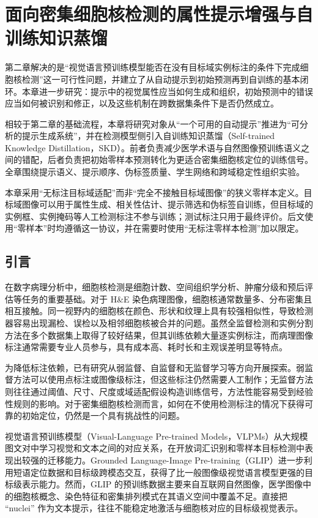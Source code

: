 \chapter{面向密集细胞核检测的属性提示增强与自训练知识蒸馏}

第二章解决的是“视觉语言预训练模型能否在没有目标域实例标注的条件下完成细胞核检测”这一可行性问题，并建立了从自动提示到初始预测再到自训练的基本闭环。本章进一步研究：提示中的视觉属性应当如何生成和组织，初始预测中的错误应当如何被识别和修正，以及这些机制在跨数据集条件下是否仍然成立。

相较于第二章的基础流程，本章将研究对象从“一个可用的自动提示”推进为“可分析的提示生成系统”，并在检测模型侧引入自训练知识蒸馏（Self-trained Knowledge Distillation，SKD）。前者负责减少医学术语与自然图像预训练语义之间的错配，后者负责把初始零样本预测转化为更适合密集细胞核定位的训练信号。全章围绕提示语义、提示顺序、伪标签质量、学生网络和跨域稳定性组织实验。

本章采用“无标注目标域适配”而非“完全不接触目标域图像”的狭义零样本定义。目标域图像可以用于属性生成、相关性估计、提示筛选和伪标签自训练，但目标域的实例框、实例掩码等人工检测标注不参与训练；测试标注只用于最终评价。后文使用“零样本”时均遵循这一协议，并在需要时使用“无标注零样本检测”加以限定。

\section{引言}

在数字病理分析中，细胞核检测是细胞计数、空间组织学分析、肿瘤分级和预后评估等任务的重要基础。对于 H\&E 染色病理图像，细胞核通常数量多、分布密集且相互接触。同一视野内的细胞核在颜色、形状和纹理上具有较强相似性，导致检测器容易出现漏检、误检以及相邻细胞核被合并的问题。虽然全监督检测和实例分割方法在多个数据集上取得了较好结果，但其训练依赖大量逐实例标注，而病理图像标注通常需要专业人员参与，具有成本高、耗时长和主观误差明显等特点。

为降低标注依赖，已有研究从弱监督、自监督和无监督学习等方向开展探索。弱监督方法可以使用点标注或图像级标注，但这些标注仍然需要人工制作；无监督方法则往往通过阈值、尺寸、尺度或域适配假设构造训练信号，方法性能容易受到经验性规则的影响。对于密集细胞核检测而言，如何在不使用检测标注的情况下获得可靠的初始定位，仍然是一个具有挑战性的问题。

视觉语言预训练模型（Visual-Language Pre-trained Models，VLPMs）从大规模图文对中学习视觉和文本之间的对应关系，在开放词汇识别和零样本目标检测中表现出较强的迁移能力。Grounded Language-Image Pre-training（GLIP）进一步利用短语定位数据和目标级跨模态交互，获得了比一般图像级视觉语言模型更强的目标级表示能力。然而，GLIP 的预训练数据主要来自互联网自然图像，医学图像中的细胞核概念、染色特征和密集排列模式在其语义空间中覆盖不足。直接把 ``nuclei'' 作为文本提示，往往不能稳定地激活与细胞核对应的目标级视觉表示。

